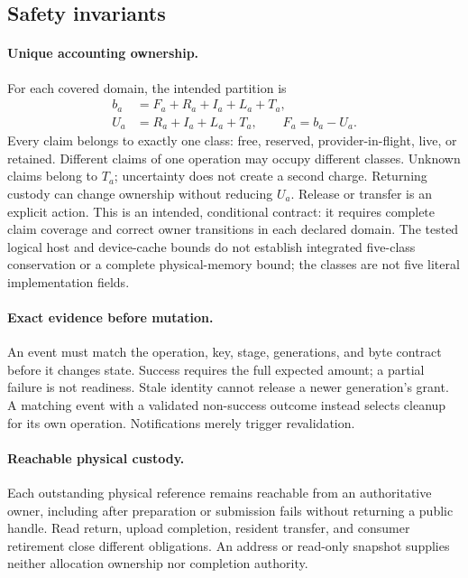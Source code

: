\subsection{Safety invariants}
\label{sec:invariants}
\paragraph{Unique accounting ownership.}
For each covered domain, the intended partition is
\begin{equation}
\begin{aligned}
 b_a&=F_a+R_a+I_a+L_a+T_a,\\
 U_a&=R_a+I_a+L_a+T_a,\qquad F_a=b_a-U_a.
\end{aligned}
\label{eq:credit-conservation}
\end{equation}
Every claim belongs to exactly one class: free, reserved, provider-in-flight,
live, or retained. Different claims of one operation may occupy different
classes. Unknown claims belong to $T_a$; uncertainty does not create a second
charge. Returning custody can change ownership without reducing $U_a$.
Release or transfer is an explicit action. This is an intended, conditional
contract: it requires complete claim coverage and correct owner transitions
in each declared domain. The tested logical host and device-cache bounds do
not establish integrated five-class conservation or a complete physical-memory
bound; the classes are not five literal implementation fields.

\paragraph{Exact evidence before mutation.}
An event must match the operation, key, stage, generations, and byte contract
before it changes state. Success requires the full expected amount; a partial
failure is not readiness. Stale identity cannot release a newer generation's
grant. A matching event with a validated non-success outcome instead selects
cleanup for its own operation. Notifications merely trigger revalidation.

\paragraph{Reachable physical custody.}
Each outstanding physical reference remains reachable from an authoritative
owner, including after preparation or submission fails without returning a
public handle. Read return, upload completion, resident transfer, and
consumer retirement close different obligations. An address or read-only
snapshot supplies neither allocation ownership nor completion authority.


